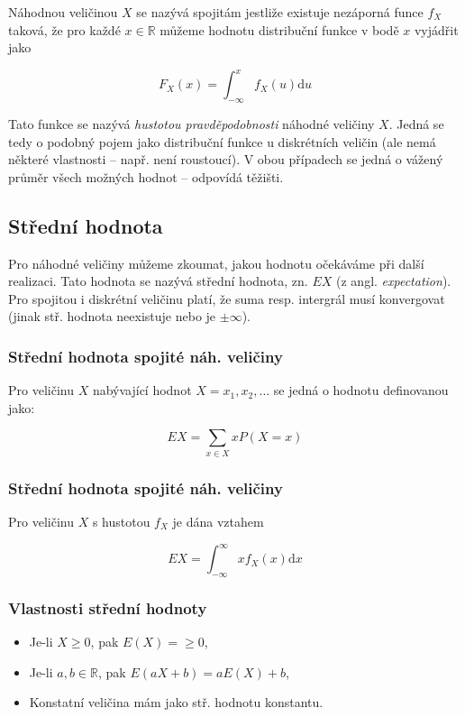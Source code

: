 Náhodnou veličinou $X$ se nazývá spojitám jestliže existuje nezáporná funce $f_X$ taková, že pro každé $x \in \mathbb{R}$ můžeme hodnotu distribuční funkce v bodě $x$ vyjádřit jako

$$
    F_X(x) = \int_{-\infty}^{x}{f_X(u) \textrm{d}u}
$$

Tato funkce se nazývá \textit{hustotou pravděpodobnosti} náhodné veličiny $X$.
Jedná se tedy o podobný pojem jako distribuční funkce u diskrétních veličin (ale nemá některé vlastnosti -- např. není roustoucí).
V obou případech se jedná o vážený průměr všech možných hodnot -- odpovídá těžišti.

\subsection{Střední hodnota}

Pro náhodné veličiny můžeme zkoumat, jakou hodnotu očekáváme při další realizaci.
Tato hodnota se nazývá střední hodnota, zn. $EX$ (z angl. \textit{expectation}).
Pro spojitou i diskrétní veličinu platí, že suma resp. intergrál musí konvergovat (jinak stř. hodnota neexistuje nebo je $\pm \infty$).

\subsubsection*{Střední hodnota spojité náh. veličiny}

Pro veličinu $X$ nabývající hodnot $X={x_1, x_2, \dots}$ se jedná o hodnotu definovanou jako:

$$
    EX = \sum_{x \in X}{x P(X = x)}
$$

\subsubsection*{Střední hodnota spojité náh. veličiny}

Pro veličinu $X$ s hustotou $f_X$ je dána vztahem

$$
    EX = \int_{-\infty}^{\infty}{x f_X(x) \textrm{d}x}
$$

\subsubsection*{Vlastnosti střední hodnoty}

\begin{itemize}
    \item Je-li $X \geq 0$, pak $E(X) = \geq 0$,
    \item Je-li $a,b \in \mathbb{R}$, pak $E(aX + b) = aE(X) + b$,
    \item Konstatní veličina mám jako stř. hodnotu konstantu.
\end{itemize}

